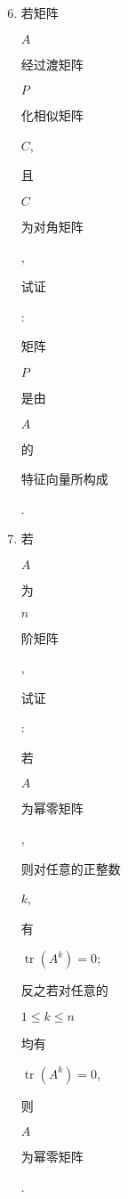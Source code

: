 \documentclass[10pt]{article}
\begin{document}
\begin{enumerate}
  \setcounter{enumi}{5}
  \item \begin{CJK}{UTF8}{mj}若矩阵\end{CJK} $A$ \begin{CJK}{UTF8}{mj}经过渡矩阵\end{CJK} $P$ \begin{CJK}{UTF8}{mj}化相似矩阵\end{CJK} $C$, \begin{CJK}{UTF8}{mj}且\end{CJK} $C$ \begin{CJK}{UTF8}{mj}为对角矩阵\end{CJK}, \begin{CJK}{UTF8}{mj}试证\end{CJK}: \begin{CJK}{UTF8}{mj}矩阵\end{CJK} $P$ \begin{CJK}{UTF8}{mj}是由\end{CJK} $A$ \begin{CJK}{UTF8}{mj}的\end{CJK} \begin{CJK}{UTF8}{mj}特征向量所构成\end{CJK}.

  \item \begin{CJK}{UTF8}{mj}若\end{CJK} $A$ \begin{CJK}{UTF8}{mj}为\end{CJK} $n$ \begin{CJK}{UTF8}{mj}阶矩阵\end{CJK}, \begin{CJK}{UTF8}{mj}试证\end{CJK}: \begin{CJK}{UTF8}{mj}若\end{CJK} $A$ \begin{CJK}{UTF8}{mj}为幂零矩阵\end{CJK}, \begin{CJK}{UTF8}{mj}则对任意的正整数\end{CJK} $k$, \begin{CJK}{UTF8}{mj}有\end{CJK} $\operatorname{tr}\left(A^{k}\right)=0$; \begin{CJK}{UTF8}{mj}反之若对任意的\end{CJK} $1 \leq k \leq n$ \begin{CJK}{UTF8}{mj}均有\end{CJK} $\operatorname{tr}\left(A^{k}\right)=0$, \begin{CJK}{UTF8}{mj}则\end{CJK} $A$ \begin{CJK}{UTF8}{mj}为幂零矩阵\end{CJK}.


\end{enumerate}
\end{document}
